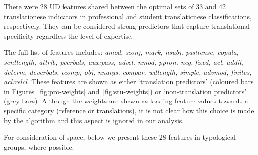 
There were 28 UD features shared between the optimal sets of 33 and 42 translationese indicators in professional and student translationese classifications, respectively. They can be considered strong predictors that capture translational specificity regardless the level of expertise.

The full list of features includes: \textit{amod, sconj, mark, nsubj, pasttense, copula, sentlength, attrib, pverbals, aux:pass, advcl, nmod, ppron, neg, fixed, acl, addit, determ, deverbals, ccomp, obj, nnargs, compar, wdlength, simple, advmod, finites, acl:relcl}. 
These features are shown as either `translation predictors' (coloured bars in Figures~\ref{fig:pro-weights} and~\ref{fig:stu-weights}) or `non-translation predictors' (grey bars). Although the weights are shown as loading feature values towards a specific category (reference or translations), it is not clear how this choice is made by the algorithm and this aspect is ignored in our analysis. 

For consideration of space, below we present these 28 features in typological groups, where possible.       

